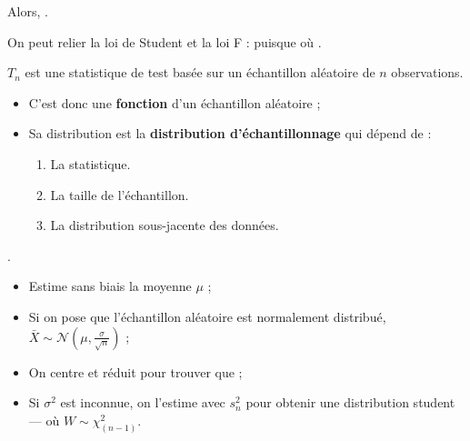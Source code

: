 \documentclass[10pt, french]{article}
\begin{document}
\begin{multicols*}{2}
\begin{rappel_enhanced}
Alors, .\\

\tcbline

On peut relier la loi de Student et la loi F :  puisque  où .
\end{rappel_enhanced}

\begin{definitionNOHFILL}
$T_{n}$ est une statistique de test basée sur un échantillon aléatoire de $n$ observations.

\begin{itemize}
\item	C'est donc une \textbf{fonction} d'un échantillon aléatoire ;
\item	Sa distribution est la \textbf{distribution d'échantillonnage} qui dépend de :
	\begin{enumerate}
	\item	La statistique.
	\item	La taille de l'échantillon.
	\item	La distribution sous-jacente des données.
	\end{enumerate}
\end{itemize}
\end{definitionNOHFILL}

\begin{definitionNOHFILLprop}
.

\begin{itemize}
	\item	Estime sans biais la moyenne $\mu$ ;
	\item	Si on pose que l'échantillon aléatoire est normalement distribué, $\bar{X}	\sim \mathcal{N}(\mu, \frac{\sigma}{\sqrt{n}})$ ;
	\item	On centre et réduit pour trouver que  ;
	\item	Si $\sigma^{2}$ est inconnue, on l'estime avec $s^{2}_{n}$ pour obtenir une distribution student--- où $W \sim \chi^{2}_{(n - 1)}$.
\end{itemize}
\end{definitionNOHFILLprop}


\end{multicols*}
\end{document}
